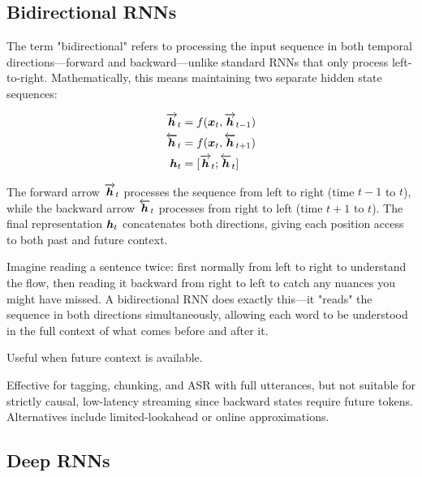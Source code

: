 \subsection{Bidirectional RNNs}

The term "bidirectional" refers to processing the input sequence in both temporal directions—forward and backward—unlike standard RNNs that only process left-to-right. Mathematically, this means maintaining two separate hidden state sequences:

\begin{align}
\overrightarrow{\boldsymbol{h}}_t &= f(\boldsymbol{x}_t, \overrightarrow{\boldsymbol{h}}_{t-1}) \\
\overleftarrow{\boldsymbol{h}}_t &= f(\boldsymbol{x}_t, \overleftarrow{\boldsymbol{h}}_{t+1}) \\
\boldsymbol{h}_t &= [\overrightarrow{\boldsymbol{h}}_t; \overleftarrow{\boldsymbol{h}}_t]
\end{align}

The forward arrow $\overrightarrow{\boldsymbol{h}}_t$ processes the sequence from left to right (time $t-1$ to $t$), while the backward arrow $\overleftarrow{\boldsymbol{h}}_t$ processes from right to left (time $t+1$ to $t$). The final representation $\boldsymbol{h}_t$ concatenates both directions, giving each position access to both past and future context.

\begin{example}
Imagine reading a sentence twice: first normally from left to right to understand the flow, then reading it backward from right to left to catch any nuances you might have missed. A bidirectional RNN does exactly this—it "reads" the sequence in both directions simultaneously, allowing each word to be understood in the full context of what comes before and after it.
\end{example}

Useful when future context is available.

\begin{example}
Effective for tagging, chunking, and ASR with full utterances, but not suitable for strictly causal, low-latency streaming since backward states require future tokens. Alternatives include limited-lookahead or online approximations.
\end{example}

\subsection{Deep RNNs}

